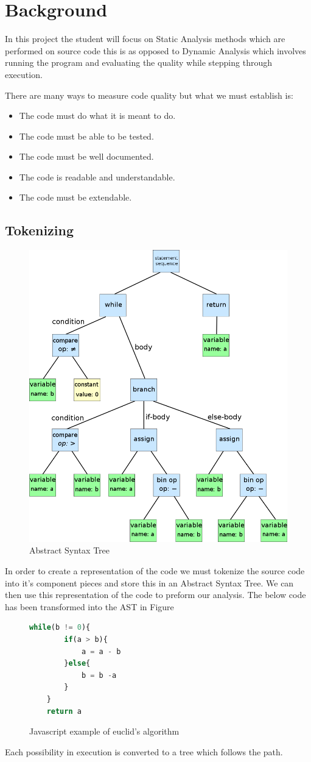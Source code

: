 \section{Background}
In this project the student will focus on Static Analysis methods which are performed on source code this is as opposed to Dynamic Analysis which involves running the program and evaluating the quality while stepping through execution.

There are many ways to measure code quality but what we must establish is:
\begin{itemize}
    \item The code must do what it is meant to do.
    \item The code must be able to be tested.
    \item The code must be well documented.
    \item The code is readable and understandable.
    \item The code must be extendable.
\end{itemize}
\subsection{Tokenizing}
\begin{figure}[h]
    \includegraphics[width=.2\textwidth]{images/abstract-syntax-tree.png}
    \caption{Abstract Syntax Tree}
    \label{fig:abs}
\end{figure}
In order to create a representation of the code we must tokenize the source code into it's component pieces and store this in an Abstract Syntax Tree. We can then use this representation of the code to preform our analysis.
The below code has been transformed into the AST in Figure 
\begin{figure}[h]
    \begin{lstlisting}[language=Javascript]
    while(b != 0){
        if(a > b){
            a = a - b
        }else{
            b = b -a 
        }
    }
    return a
    \end{lstlisting}
    \caption{Javascript example of euclid's algorithm}
  \label{fig:euclid}
\end{figure}
Each possibility in execution is converted to a tree which follows the path.
